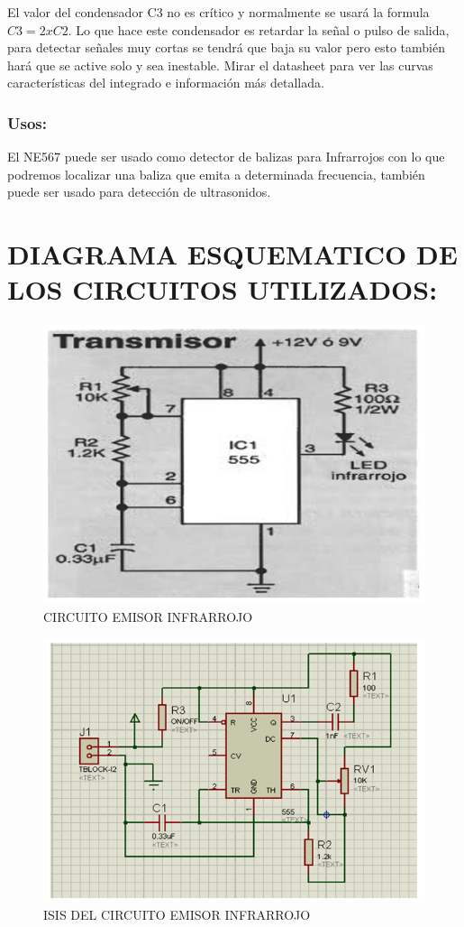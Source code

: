 \documentclass[a4paper,11pt]{article}
\begin{document}
El valor del condensador C3 no es crítico y normalmente se usará la formula  $C3 = 2xC2$. Lo que hace este condensador es retardar la señal o pulso de salida, para detectar señales muy cortas se tendrá que baja su valor pero esto también hará que se active solo y sea inestable.
Mirar el datasheet para ver las curvas características del integrado e información más detallada. 

\subsubsection{Usos:}
El NE567 puede ser usado como detector de balizas para Infrarrojos con lo que podremos localizar una baliza que emita a determinada frecuencia, también puede ser usado para detección de ultrasonidos.

\section{DIAGRAMA ESQUEMATICO DE LOS CIRCUITOS UTILIZADOS:}

	\begin{figure}[h]
		\caption{CIRCUITO EMISOR INFRARROJO}
		\centering
		\includegraphics[width=0.7\linewidth]{./10}
	\end{figure}

	\begin{figure}[h]
		\caption{ISIS DEL CIRCUITO EMISOR INFRARROJO}
		\centering
		\includegraphics[width=0.7\linewidth]{./11}
	\end{figure}
\end{document}
